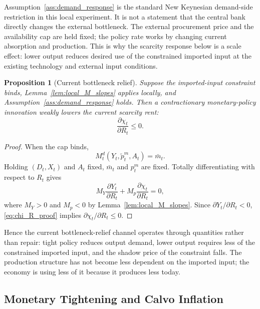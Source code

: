 ﻿\documentclass[12pt]{article}
\newtheorem{proposition}{Proposition}
\theoremstyle{remark}
\begin{document}
Assumption~\ref{ass:demand_response} is the standard New Keynesian demand-side restriction in this
local experiment. It is not a statement that the central bank directly changes the external
bottleneck. The external procurement price and the availability cap are held fixed; the policy rate
works by changing current absorption and production. This is why the scarcity response below is a
scale effect: lower output reduces desired use of the constrained imported input at the existing
technology and external input conditions.

\begin{proposition}[Current bottleneck relief]\label{prop:current_bottleneck_relief}
Suppose the imported-input constraint binds, Lemma~\ref{lem:local_M_slopes} applies locally, and
Assumption~\ref{ass:demand_response} holds. Then a contractionary monetary-policy innovation
weakly lowers the current scarcity rent:
\begin{equation}
    \frac{\partial \chi_t}{\partial R_t}\le 0.
    \label{eq:chi_R_negative}
\end{equation}
\end{proposition}

\begin{proof}
When the cap binds,
\begin{equation}
    M_t^d(Y_t,\tilde p_t^m,A_t)=\bar m_t.
    \label{eq:M_market_R}
\end{equation}
Holding $(D_t,X_t)$ and $A_t$ fixed, $\bar m_t$ and $p_t^m$ are fixed. Totally differentiating
with respect to $R_t$ gives
\begin{equation}
    M_Y\frac{\partial Y_t}{\partial R_t}
    +
    M_p\frac{\partial \chi_t}{\partial R_t}
    =
    0,
    \label{eq:chi_R_proof}
\end{equation}
where $M_Y>0$ and $M_p<0$ by Lemma~\ref{lem:local_M_slopes}. Since
$\partial Y_t/\partial R_t<0$, \eqref{eq:chi_R_proof} implies
$\partial\chi_t/\partial R_t\le 0$.
\end{proof}

Hence the current bottleneck-relief channel operates through quantities rather than repair: tight
policy reduces output demand, lower output requires less of the constrained imported input, and the
shadow price of the constraint falls. The production structure has not become less dependent on the
imported input; the economy is using less of it because it produces less today.

\subsection{Monetary Tightening and Calvo Inflation}
\end{document}
